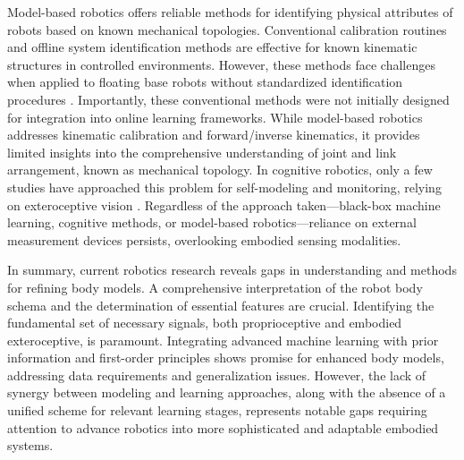 \documentclass[12pt, a4paper]{article}
\begin{document}
Model-based robotics offers reliable methods for identifying physical attributes of robots based on known mechanical topologies. Conventional calibration routines \cite{Hollerbach1996CalibrationIndexTaxonomy} and offline system identification methods \cite{Swevers2007Dynamicmodelidentification,LeboutetInertialParameterIdentification} are effective for known kinematic structures in controlled environments. However, these methods face challenges when applied to floating base robots without standardized identification procedures \cite{Ayusawa2014Identifiabilityidentificationinertial,Lee2022OptimizedSystemIdentification}. Importantly, these conventional methods were not initially designed for integration into online learning frameworks. While model-based robotics addresses kinematic calibration and forward/inverse kinematics, it provides limited insights into the comprehensive understanding of joint and link arrangement, known as mechanical topology. In cognitive robotics, only a few studies have approached this problem for self-modeling and monitoring, relying on exteroceptive vision \cite{Bongard2006Automatedsynthesisbody,Bongard2006Resilientmachinescontinuous}. Regardless of the approach taken—black-box machine learning, cognitive methods, or model-based robotics—reliance on external measurement devices persists, overlooking embodied sensing modalities.

In summary, current robotics research reveals gaps in understanding and methods for refining body models. A comprehensive interpretation of the robot body schema and the determination of essential features are crucial. Identifying the fundamental set of necessary signals, both proprioceptive and embodied exteroceptive, is paramount. Integrating advanced machine learning with prior information and first-order principles shows promise for enhanced body models, addressing data requirements and generalization issues. However, the lack of synergy between modeling and learning approaches, along with the absence of a unified scheme for relevant learning stages, represents notable gaps requiring attention to advance robotics into more sophisticated and adaptable embodied systems.
\end{document}
